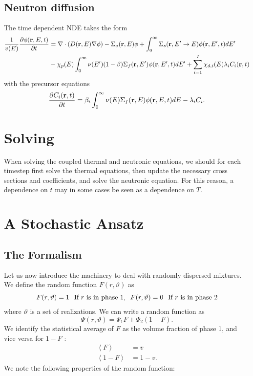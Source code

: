 \documentclass[12pt]{article}
\begin{document}
\subsection{Neutron diffusion}
The time dependent NDE takes the form 
\begin{align}
    \frac{1}{v(E)} \frac{\partial \phi (\bold{r},E,t)}{\partial t}&=\bold{\nabla} \cdot (D(\bold{r}, E)\bold{\nabla} \phi)-\Sigma_a (\bold{r},E)\phi+\int_{0}^{\infty}\Sigma_s(\bold{r}, E'\rightarrow E)\phi(\bold{r},E',t)dE' \notag \\ & +\chi_p(E) \int_0 ^{\infty} \nu(E') (1-\beta)\Sigma_f (\bold{r},E')\phi(\bold{r},E',t)dE' +\sum_{i=1}^{I} \chi_{d,i}(E)\lambda_i C_i(\bold{r},t) \label{TDNDE}
\end{align}
with the precursor equations 
\begin{equation}
    \frac{\partial C_i({\bold{r},t)}}{\partial t}=\beta_i \int_0^\infty \nu(E) \Sigma_f (\bold{r},E) \phi(\bold{r}, E,t)dE-\lambda_i C_i .
\end{equation}

\section{Solving}
When solving the coupled thermal and neutronic equations, we should for each timestep first solve the thermal equations, then update the necessary cross sections and coefficients, and solve the neutronic equation. For this reason, a dependence on $t$ may in some cases be seen as a dependence on $T$.

\section{A Stochastic Ansatz}
\subsection{The Formalism}
Let us now introduce the machinery to deal with randomly dispersed mixtures. We define the random function $F(r,\vartheta)$ as 
\begin{equation}
    F(r,\vartheta)=1 \hspace{0.25cm}\text{If $r$ is in phase 1,} \hspace{0.25cm} F(r, \vartheta)=0 \hspace{0.25cm} \text{If $r$ is in phase 2}
\end{equation}
where $\vartheta$ is a set of realizations. We can write a random function as 
\begin{equation}
    \Psi(r, \vartheta)=\Psi_1 F+ \Psi_2 (1-F).
\end{equation}
We identify the statistical average of $F$ as the volume fraction of phase 1, and vice versa for $1-F$ :
\begin{align}
    \left< F \right>&=v \\
    \left< 1-F \right>& = 1-v.
\end{align}
We note the following properties of the random function: 
\end{document}
